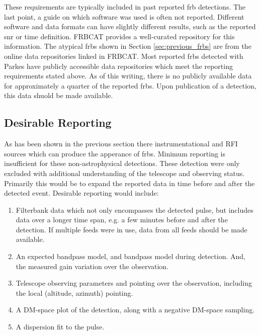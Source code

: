 \documentclass[a4paper,fleqn,usenatbib]{mnras}
\begin{document}
These requirements are typically included in past reported \gls{frb} detections.
The last point, a guide on which software was used is often not reported.
Different software and data formats can have slightly different results, such as
the reported \gls{snr} or time definition.  FRBCAT \citep{2016PASA...33...45P}
provides a well-curated repository for this information. The atypical
\glspl{frb} shown in Section \ref{sec:previous_frbs} are from the online data
repositories linked in FRBCAT. Most reported \glspl{frb} detected with Parkes
have publicly accessible data repositories which meet the reporting requirements
stated above. As of this writing, there is no publicly available data for
approximately a quarter of the reported \glspl{frb}. Upon publication of a
detection, this data shuold be made available.

\subsection{Desirable Reporting}

As has been shown in the previous section there instrumentational and RFI
sources which can produce the apperance of \glspl{frb}. Minimum reporting is
insufficient for these non-astrophysical detections. These detection were only
excluded with additional understanding of the telescope and observing status.
Primarily this would be to expand the reported data in time before and after the
detected event. Desirable reporting would include:

\begin{enumerate}
    \item Filterbank data which not only encompasses the detected pulse, but
    includes data over a longer time span, e.g. a few minutes before and after
    the detection. If multiple feeds were in use, data from all feeds should be
    made available.
    \item An expected bandpass model, and bandpass model during detection. And,
    the measured gain variation over the observation.
    \item Telescope observing parameters and pointing over the observation,
    including the local (altitude, azimuth) pointing.
    \item A DM-space plot of the detection, along with a negative DM-space
    sampling.
    \item A dispersion fit to the pulse.
\end{enumerate}
\end{document}

